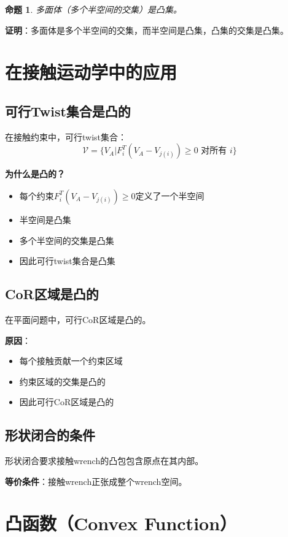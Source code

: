 \documentclass[12pt,a4paper]{article}
\newtheorem{proposition}{命题}
\begin{document}
\begin{proposition}
多面体（多个半空间的交集）是凸集。
\end{proposition}

\textbf{证明}：多面体是多个半空间的交集，而半空间是凸集，凸集的交集是凸集。

\section{在接触运动学中的应用}

\subsection{可行Twist集合是凸的}

在接触约束中，可行twist集合：
\begin{equation}
\mathcal{V} = \{V_A | F_i^T (V_A - V_{j(i)}) \geq 0 \text{ 对所有 } i\}
\end{equation}

\textbf{为什么是凸的？}
\begin{itemize}
\item 每个约束$F_i^T (V_A - V_{j(i)}) \geq 0$定义了一个半空间
\item 半空间是凸集
\item 多个半空间的交集是凸集
\item 因此可行twist集合是凸集
\end{itemize}

\subsection{CoR区域是凸的}

在平面问题中，可行CoR区域是凸的。

\textbf{原因}：
\begin{itemize}
\item 每个接触贡献一个约束区域
\item 约束区域的交集是凸的
\item 因此可行CoR区域是凸的
\end{itemize}

\subsection{形状闭合的条件}

形状闭合要求接触wrench的凸包包含原点在其内部。

\textbf{等价条件}：接触wrench正张成整个wrench空间。

\section{凸函数（Convex Function）}
\end{document}
